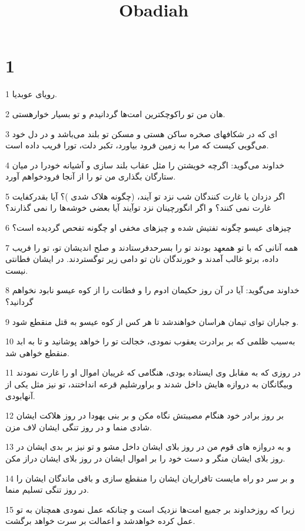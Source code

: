 

\title{Obadiah}


\chapter{1}

\par 1 رویای عوبدیا.
\par 2 هان من تو راکوچکترین امت‌ها گردانیدم و تو بسیار خوارهستی.
\par 3 ‌ای که در شکافهای صخره ساکن هستی و مسکن تو بلند می‌باشد و در دل خود می‌گویی کیست که مرا به زمین فرود بیاورد، تکبر دلت، تورا فریب داده است.
\par 4 خداوند می‌گوید: اگرچه خویشتن را مثل عقاب بلند سازی و آشیانه خودرا در میان ستارگان بگذاری من تو را از آنجا فرودخواهم آورد.
\par 5 اگر دزدان یا غارت کنندگان شب نزد تو آیند، (چگونه هلاک شدی )؟ آیا بقدرکفایت غارت نمی کنند؟ و اگر انگورچینان نزد توآیند آیا بعضی خوشه‌ها را نمی گذارند؟
\par 6 چیزهای عیسو چگونه تفتیش شده و چیزهای مخفی او چگونه تفحص گردیده است؟
\par 7 همه آنانی که با تو همعهد بودند تو را بسرحدفرستادند و صلح اندیشان تو، تو را فریب داده، برتو غالب آمدند و خورندگان نان تو دامی زیر توگستردند. در ایشان فطانتی نیست.
\par 8 خداوند می‌گوید: آیا در آن روز حکیمان ادوم را و فطانت را از کوه عیسو نابود نخواهم گردانید؟
\par 9 و جباران تو‌ای تیمان هراسان خواهندشد تا هر کس از کوه عیسو به قتل منقطع شود.
\par 10 به‌سبب ظلمی که بر برادرت یعقوب نمودی، خجالت تو را خواهد پوشانید و تا به ابد منقطع خواهی شد.
\par 11 در روزی که به مقابل وی ایستاده بودی، هنگامی که غریبان اموال او را غارت نمودند وبیگانگان به دروازه هایش داخل شدند و براورشلیم قرعه انداختند، تو نیز مثل یکی از آنهابودی.
\par 12 بر روز برادر خود هنگام مصیبتش نگاه مکن و بر بنی یهودا در روز هلاکت ایشان شادی منما و در روز تنگی ایشان لاف مزن.
\par 13 و به دروازه های قوم من در روز بلای ایشان داخل مشو و تو نیز بر بدی ایشان در روز بلای ایشان منگر و دست خود را بر اموال ایشان در روز بلای ایشان دراز مکن.
\par 14 و بر سر دو راه مایست تافراریان ایشان را منقطع سازی و باقی ماندگان ایشان را در روز تنگی تسلیم منما.
\par 15 زیرا که روزخداوند بر جمیع امت‌ها نزدیک است و چنانکه عمل نمودی همچنان به تو عمل کرده خواهدشد و اعمالت بر سرت خواهد برگشت.
